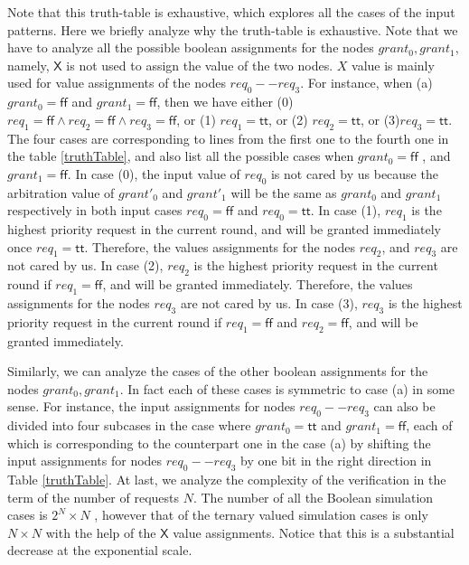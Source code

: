 \documentclass[final]{IEEEtran}
\begin{document}
Note that this truth-table is exhaustive, which explores all the cases of
the input patterns. Here we briefly analyze why the truth-table is
exhaustive. Note that we have to analyze all the possible boolean
assignments for the nodes $grant_0, grant_1$, namely, $\mathsf{X}$ is not used
to assign the value of the two nodes. $X$ value is mainly used for value
assignments of the nodes $req_0--req_3$. For instance, when (a) $grant_0=%
\mathsf{ff}$ and $grant_1=\mathsf{ff}$, then we have either (0) $req_1=%
\mathsf{ff} \wedge req_2=\mathsf{ff} \wedge req_3=\mathsf{ff}$, or (1) $req_1=%
\mathsf{tt}$, or (2) $req_2=\mathsf{tt}$, or (3)$req_3=\mathsf{tt}$. The
four cases are corresponding to  lines from the first one to the fourth  one in the
table \ref{truthTable}, and also list all the possible cases when $grant_0=\mathsf{ff}$%
, and $grant_1=\mathsf{ff}$. In case (0), the input value of $req_0$
is not
cared by us because the arbitration value of $grant'_0$ and $%
grant'_1$ will be the same as $grant_0$ and $grant_1$
respectively in
both input cases $req_0=\mathsf{ff}$ and $req_0=\mathsf{tt}$. In case (1), $%
req_1$ is the highest priority request in the current round, and will be
granted immediately once $req_1=\mathsf{tt}$. Therefore, the values
assignments for the nodes $req_2$, and $req_3 $ are not cared by us. In case
(2), $req_2$ is the highest priority request in the current round if $req_1=%
\mathsf{ff}$, and will be granted immediately. Therefore, the values
assignments for the nodes $req_3 $ are not cared by us. In case (3), $req_3$
is the highest priority request in the current round if $req_1=\mathsf{ff}$
and $req_2=\mathsf{ff}$, and will be granted immediately.

Similarly, we can analyze the cases of the other boolean assignments
for the nodes $grant_0, grant_1$. In fact each of  these cases is
symmetric to
case (a) in some sense. For instance, the input assignments for nodes $%
req_0--req_3$ can also be divided into four subcases in the case where $%
grant_0=\mathsf{tt}$ and $grant_1=\mathsf{ff}$, each of which is
corresponding to the counterpart one in the case (a) by shifting the
input assignments for nodes $req_0--req_3$ by one bit in the right
direction in Table \ref{truthTable}. At last, we analyze the
complexity of the verification in the term of the number of
requests $N$. The number of all the Boolean simulation cases is $2^N\times N$%
, however that of the ternary valued simulation cases  is only $N
\times N$ with the help of the $\mathsf{X}$ value assignments.
Notice that this is a substantial decrease at the exponential scale.
\end{document}
